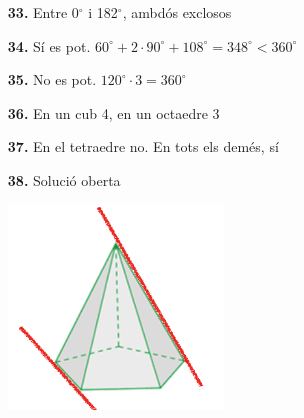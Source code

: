 \documentclass[a4paper, pdf, twoside]{book}
\begin{document}
\begin{multicols}{2}
\begin{enumerate}
\item[\fontfamily{phv}\selectfont\color{blue}\textbf{33. }] 
Entre 0$^\circ $ i 182$^\circ $, ambdós exclosos
\vspace{0.25cm}
\item[\fontfamily{phv}\selectfont\color{blue}\textbf{34. }] 
Sí es pot. $60^\circ + 2 \cdot 90^\circ + 108^\circ = 348^\circ < 360^\circ $
\vspace{0.25cm}
\item[\fontfamily{phv}\selectfont\color{blue}\textbf{35. }] 
No es pot. $120^\circ \cdot 3 = 360^\circ $
\vspace{0.25cm}
\item[\fontfamily{phv}\selectfont\color{blue}\textbf{36. }] 
En un cub 4, en un octaedre 3
\vspace{0.25cm}
\item[\fontfamily{phv}\selectfont\color{blue}\textbf{37. }] 
En el tetraedre no. En tots els demés, sí
\vspace{0.25cm}
\item[\fontfamily{phv}\selectfont\color{blue}\textbf{38. }] 
Solució oberta\par \includegraphics [width=0.45\textwidth ]{img-sol/t11-41}
 \end{enumerate}
\vspace{0.3cm}



\end{multicols}
\end{document}
